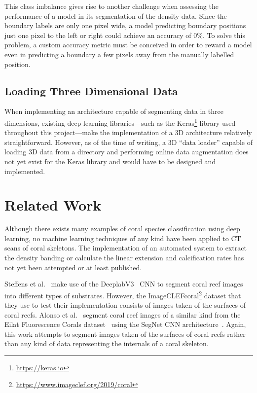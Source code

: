 This class imbalance gives rise to another challenge when assessing the performance of a model in its segmentation of the density data. Since the boundary labels are only one pixel wide, a model predicting boundary positions just one pixel to the left or right could achieve an accuracy of 0\%. To solve this problem, a custom accuracy metric must be conceived in order to reward a model even in predicting a boundary a few pixels away from the manually labelled position.

\subsection{Loading Three Dimensional Data}

When implementing an architecture capable of segmenting data in three dimensions, existing deep learning libraries---such as the Keras\footnote{\url{https://keras.io}} library used throughout this project---make the implementation of a 3D architecture relatively straightforward. However, as of the time of writing, a 3D ``data loader'' capable of loading 3D data from a directory and performing online data augmentation does not yet exist for the Keras library and would have to be designed and implemented.

\section{Related Work}

Although there exists many examples of coral species classification using deep learning, no machine learning techniques of any kind have been applied to CT scans of coral skeletons. The implementation of an automated system to extract the density banding or calculate the linear extension and calcification rates has not yet been attempted or at least published.

Steffens et al.~\cite{steff} make use of the DeeplabV3~\cite{deeplab} CNN to segment coral reef images into different types of substrates. However, the ImageCLEFcoral\footnote{\url{https://www.imageclef.org/2019/coral}} dataset that they use to test their implementation consists of images taken of the surfaces of coral reefs. Alonso et al.~\cite{alonso} segment coral reef images of a similar kind from the Eilat Fluorescence Corals dataset~\cite{eilat} using the SegNet CNN architecture~\cite{segnet}. Again, this work attempts to segment images taken of the surfaces of coral reefs rather than any kind of data representing the internals of a coral skeleton.


